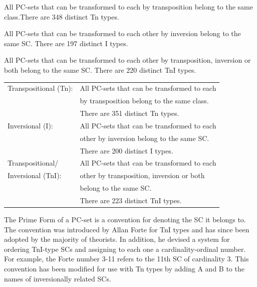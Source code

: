 \documentclass{article}
\begin{document}
\begin{description}[style=multiline,leftmargin=2.5cm,font=\normalfont]
\item[Transpositional (Tn)] All PC-sets that can be transformed to each by transposition belong to the same class.There are 348 distinct Tn types.
\item[Inversional (I)] All PC-sets that can be transformed to each other by inversion belong to the same SC. There are 197 distinct I types.
\item[Transpositional/Inversional (TnI)] All PC-sets that can be transformed to each other by transposition, inversion or both belong to the same SC. There are 220 distinct TnI types.
\end{description}


\begin{center}
\begin{tabular}{ll}
 Transpositional (Tn):  &  All PC-sets that can be transformed to each  \\
                        &  by transposition belong to the same class.   \\
                        &  There are 351 distinct Tn types.             \\
 Inversional (I):       &  All PC-sets that can be transformed to each  \\
                        &  other by inversion belong to the same SC.    \\
                        &  There are 200 distinct I types.              \\
 Transpositional/       &  All PC-sets that can be transformed to each  \\
 Inversional (TnI):     &  other by transposition, inversion or both    \\
                        &  belong to the same SC.                       \\
                        &  There are 223 distinct TnI types.            \\
\end{tabular}
\end{center}



The Prime Form of a PC-set is a convention for denoting the SC it
belongs to. The convention was introduced by Allan Forte
\citep{Forte1973} for TnI types and has since been adopted by the
majority of theorists. In addition, he devised a system for ordering
TnI-type SCs and assigning to each one a cardinality-ordinal
number. For example, the Forte number 3-11 refers to the 11th SC of
cardinality 3. This convention has been modified for use with Tn types
by adding A and B to the names of inversionally related SCs.
\end{document}
